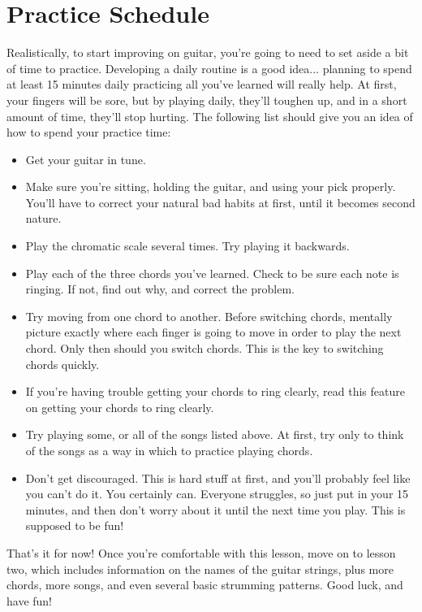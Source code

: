 \section{Practice Schedule}
Realistically, to start improving on guitar, you're going to need to set aside
a bit of time to practice. Developing a daily routine is a good idea...
planning to spend at least 15 minutes daily practicing all you've learned will
really help. At first, your fingers will be sore, but by playing daily, they'll
toughen up, and in a short amount of time, they'll stop hurting. The following
list should give you an idea of how to spend your practice time:
%
\begin{itemize}
\item Get your guitar in tune.
\item Make sure you're sitting, holding the guitar, and using your pick properly. You'll have to correct your natural bad habits at first, until it becomes second nature.
\item Play the chromatic scale several times. Try playing it backwards.
\item Play each of the three chords you've learned. Check to be sure each note is ringing. If not, find out why, and correct the problem.
\item Try moving from one chord to another. Before switching chords, mentally picture exactly where each finger is going to move in order to play the next chord. Only then should you switch chords. This is the key to switching chords quickly. 
\item If you're having trouble getting your chords to ring clearly, read this feature on getting your chords to ring clearly.
\item Try playing some, or all of the songs listed above. At first, try only to think of the songs as a way in which to practice playing chords.
\item Don't get discouraged. This is hard stuff at first, and you'll probably feel like you can't do it. You certainly can. Everyone struggles, so just put in your 15 minutes, and then don't worry about it until the next time you play. This is supposed to be fun! 
\end{itemize}
%
That's it for now! Once you're comfortable with this lesson, move on to lesson
two, which includes information on the names of the guitar strings, plus more
chords, more songs, and even several basic strumming patterns. Good luck, and
have fun! 

